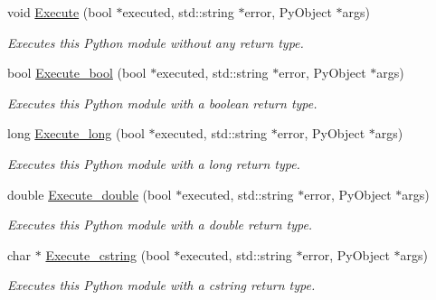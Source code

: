 \begin{DoxyCompactItemize}
void \hyperlink{classjetfuel_1_1inspire_1_1Python__module__loader_a99f8d8ee9f65c15b10b91ba7e59033c0}{Execute} (bool $\ast$executed, std\+::string $\ast$error, Py\+Object $\ast$args)
\begin{DoxyCompactList}\small\item\em Executes this Python module without any return type. \end{DoxyCompactList}\item 
bool \hyperlink{classjetfuel_1_1inspire_1_1Python__module__loader_a3c51521e298f05b5fbb702327aa102b3}{Execute\+\_\+bool} (bool $\ast$executed, std\+::string $\ast$error, Py\+Object $\ast$args)
\begin{DoxyCompactList}\small\item\em Executes this Python module with a boolean return type. \end{DoxyCompactList}\item 
long \hyperlink{classjetfuel_1_1inspire_1_1Python__module__loader_a7f1608c46e4d3c9f7a019f80a78c6756}{Execute\+\_\+long} (bool $\ast$executed, std\+::string $\ast$error, Py\+Object $\ast$args)
\begin{DoxyCompactList}\small\item\em Executes this Python module with a long return type. \end{DoxyCompactList}\item 
double \hyperlink{classjetfuel_1_1inspire_1_1Python__module__loader_a058df0a03f3477bb7d576d5873246aa7}{Execute\+\_\+double} (bool $\ast$executed, std\+::string $\ast$error, Py\+Object $\ast$args)
\begin{DoxyCompactList}\small\item\em Executes this Python module with a double return type. \end{DoxyCompactList}\item 
char $\ast$ \hyperlink{classjetfuel_1_1inspire_1_1Python__module__loader_a83af544f1b515c3606ed91e9c8ba9494}{Execute\+\_\+cstring} (bool $\ast$executed, std\+::string $\ast$error, Py\+Object $\ast$args)
\begin{DoxyCompactList}\small\item\em Executes this Python module with a cstring return type. \end{DoxyCompactList}\end{DoxyCompactItemize}
